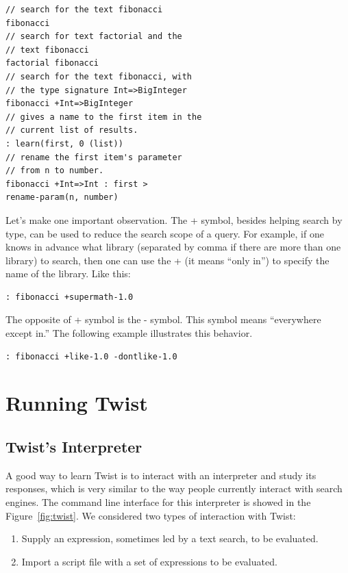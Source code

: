\begin{verbatim}
// search for the text fibonacci	
fibonacci
// search for text factorial and the 
// text fibonacci
factorial fibonacci
// search for the text fibonacci, with 
// the type signature Int=>BigInteger 
fibonacci +Int=>BigInteger 
// gives a name to the first item in the 
// current list of results.
: learn(first, 0 (list))
// rename the first item's parameter 
// from n to number.
fibonacci +Int=>Int : first > 
rename-param(n, number) 
\end{verbatim}
	 
Let's make one important observation. The + symbol, besides helping search by type, can be used to reduce the search scope of a query. For example, if one knows in advance what library (separated by comma if there are more than one library) to search, then one can use the + (it means ``only in'') to specify the name of the library. Like this:

\begin{verbatim}
: fibonacci +supermath-1.0 
\end{verbatim}

The opposite of + symbol is the - symbol. This symbol means ``everywhere except in.'' The following example illustrates this behavior.

\begin{verbatim}
: fibonacci +like-1.0 -dontlike-1.0
\end{verbatim}

\section{Running Twist}
\label{sec:running}

\subsection{Twist's Interpreter}
\label{sec:interpreter}

A good way to learn Twist is to interact with an interpreter and study its responses, which is very similar to the way people currently interact with search engines. The command line interface for this interpreter is showed in the Figure~\ref{fig:twist}. We considered two types of interaction with Twist: 

\begin{enumerate}
	\item Supply an expression, sometimes led by a text search, to be evaluated.
	\item Import a script file with a set of expressions to be evaluated. 
\end{enumerate}	


